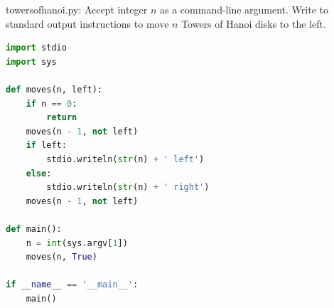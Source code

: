 \documentclass[8pt,a4paper,compress]{beamer}
\begin{document}
\begin{frame}[fragile]
\pause

\begin{framed}
\tiny towersofhanoi.py: Accept integer $n$ as a command-line argument. Write to standard output instructions to move $n$ Towers of Hanoi disks to the left.
\end{framed}

\begin{minipage}{200pt}
\begin{lstlisting}[language=Python,style=focusin]
import stdio
import sys

def moves(n, left):
    if n == 0:
        return
    moves(n - 1, not left)
    if left:
        stdio.writeln(str(n) + ' left')
    else:
        stdio.writeln(str(n) + ' right')
    moves(n - 1, not left)

def main():
    n = int(sys.argv[1])
    moves(n, True)

if __name__ == '__main__':
    main()
\end{lstlisting}

\pause


\end{minipage}
\end{frame}
\end{document}
